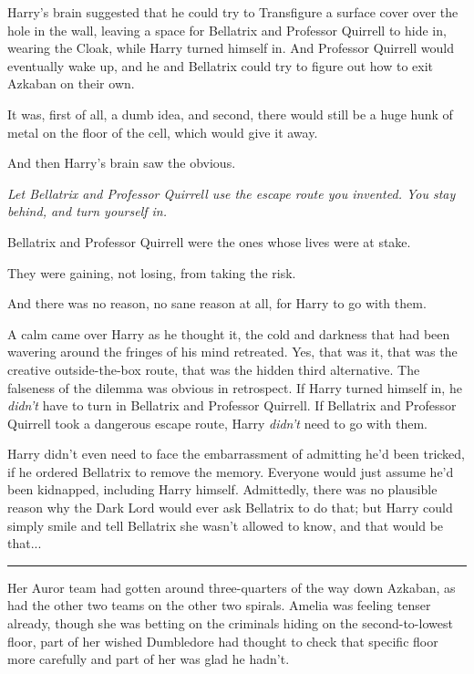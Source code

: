 Harry's brain suggested that he could try to Transfigure a surface cover over the hole in the wall, leaving a space for Bellatrix and Professor Quirrell to hide in, wearing the Cloak, while Harry turned himself in. And Professor Quirrell would eventually wake up, and he and Bellatrix could try to figure out how to exit Azkaban on their own.

It was, first of all, a dumb idea, and second, there would still be a huge hunk of metal on the floor of the cell, which would give it away.

And then Harry's brain saw the obvious.

\emph{Let Bellatrix and Professor Quirrell use the escape route you invented. You stay behind, and turn yourself in.}

Bellatrix and Professor Quirrell were the ones whose lives were at stake.

They were gaining, not losing, from taking the risk.

And there was no reason, no sane reason at all, for Harry to go with them.

A calm came over Harry as he thought it, the cold and darkness that had been wavering around the fringes of his mind retreated. Yes, that was it, that was the creative outside-the-box route, that was the hidden third alternative. The falseness of the dilemma was obvious in retrospect. If Harry turned himself in, he \emph{didn't} have to turn in Bellatrix and Professor Quirrell. If Bellatrix and Professor Quirrell took a dangerous escape route, Harry \emph{didn't} need to go with them.

Harry didn't even need to face the embarrassment of admitting he'd been tricked, if he ordered Bellatrix to remove the memory. Everyone would just assume he'd been kidnapped, including Harry himself. Admittedly, there was no plausible reason why the Dark Lord would ever ask Bellatrix to do that; but Harry could simply smile and tell Bellatrix she wasn't allowed to know, and that would be that...

\begin{center}\rule{3in}{0.4pt}\end{center}

Her Auror team had gotten around three-quarters of the way down Azkaban, as had the other two teams on the other two spirals. Amelia was feeling tenser already, though she was betting on the criminals hiding on the second-to-lowest floor, part of her wished Dumbledore had thought to check that specific floor more carefully and part of her was glad he hadn't.

